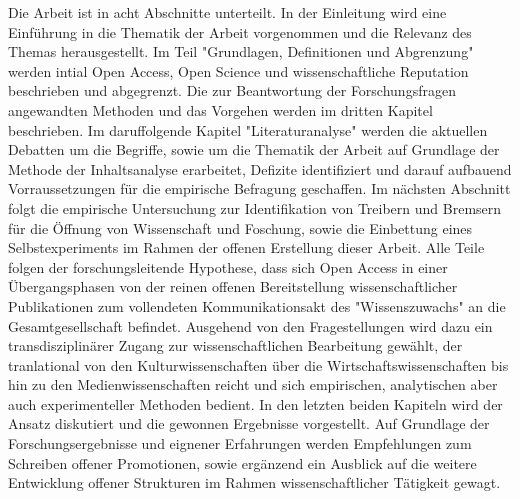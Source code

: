 Die Arbeit ist in acht Abschnitte unterteilt. In der Einleitung wird eine Einführung in die Thematik der Arbeit vorgenommen und die Relevanz des Themas herausgestellt. Im Teil "Grundlagen, Definitionen und Abgrenzung" werden intial Open Access, Open Science und wissenschaftliche Reputation beschrieben und abgegrenzt. Die zur Beantwortung der Forschungsfragen angewandten Methoden und das Vorgehen werden im dritten Kapitel beschrieben. Im daruffolgende Kapitel "Literaturanalyse" werden die aktuellen Debatten um die Begriffe, sowie um die Thematik der Arbeit auf Grundlage der Methode der Inhaltsanalyse erarbeitet, Defizite identifiziert und darauf aufbauend Vorraussetzungen für die empirische Befragung geschaffen. Im nächsten Abschnitt folgt die empirische Untersuchung zur Identifikation von Treibern und Bremsern für die Öffnung von Wissenschaft und Foschung, sowie die Einbettung eines Selbstexperiments im Rahmen der offenen Erstellung dieser Arbeit. Alle Teile folgen der forschungsleitende Hypothese, dass sich Open Access in einer Übergangsphasen von der reinen offenen Bereitstellung wissenschaftlicher Publikationen zum vollendeten Kommunikationsakt des "Wissenszuwachs" \cite{Luhmann1998} an die Gesamtgesellschaft befindet. Ausgehend von den Fragestellungen wird dazu ein transdisziplinärer Zugang zur wissenschaftlichen Bearbeitung gewählt, der tranlational von den Kulturwissenschaften über die Wirtschaftswissenschaften bis hin zu den Medienwissenschaften reicht und sich empirischen, analytischen aber auch experimenteller Methoden bedient. In den letzten beiden Kapiteln wird der Ansatz diskutiert und die gewonnen Ergebnisse vorgestellt. Auf Grundlage der Forschungsergebnisse und eignener Erfahrungen werden Empfehlungen zum Schreiben offener Promotionen, sowie ergänzend ein Ausblick auf die weitere Entwicklung offener Strukturen im Rahmen wissenschaftlicher Tätigkeit gewagt.
